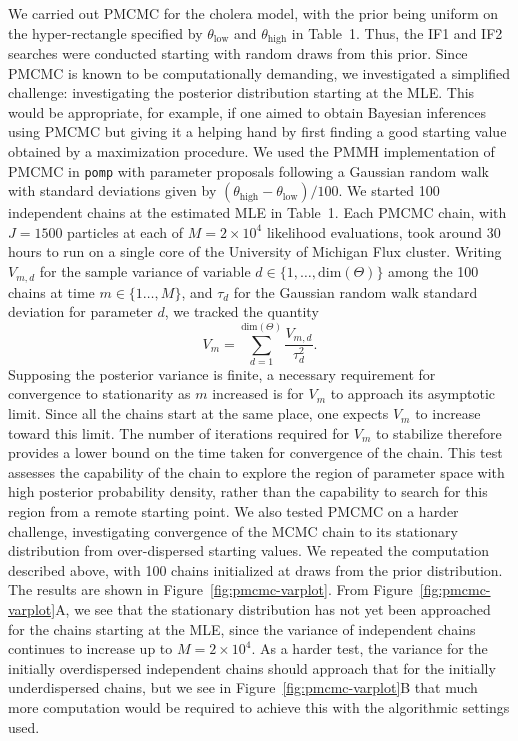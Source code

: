 \documentclass[11pt]{article}
\newcommand{\bbTheta}{\Theta}
\newcommand\Thetaspace{{\bbTheta}}
\newcommand\Thetadim{{\mathrm{dim}}(\Thetaspace)}
\begin{document}
We carried out PMCMC for the cholera model, with the prior being uniform on the hyper-rectangle specified by $\theta_\mathrm{low}$ and $\theta_\mathrm{high}$ in Table~1.
Thus, the IF1 and IF2 searches were conducted starting with random draws from this prior.
Since PMCMC is known to be computationally demanding, we investigated a simplified challenge: investigating the posterior distribution starting at the MLE.
This would be appropriate, for example, if one aimed to obtain Bayesian inferences using PMCMC but giving it a helping hand by first finding a good starting value obtained by a maximization procedure.
We used the PMMH implementation of PMCMC in \texttt{pomp} \cite{pomp} with parameter proposals following a Gaussian random walk with standard deviations given by $(\theta_\mathrm{high}-\theta_\mathrm{low})/100$.
We started 100 independent chains at the estimated MLE in Table~1.
Each PMCMC chain, with $J=1500$ particles at each of $M=2\times10^4$ likelihood evaluations, took around 30 hours to run on a single core of the University of Michigan Flux cluster.
Writing $V_{m,d}$ for the sample variance of variable $d\in\{1,\dots,\Thetadim\}$ among the 100 chains at time $m\in\{1\dots,M\}$, and $\tau_d$ for the Gaussian random walk standard deviation for parameter $d$, we tracked the quantity
\begin{equation}\label{eq:pmcmc-Vm}
V_m=\sum_{d=1}^{\Thetadim} \frac{V_{m,d}}{\tau_d^{2}}.
\end{equation}
Supposing the posterior variance is finite, a necessary requirement for convergence to stationarity as $m$ increased is for $V_m$ to approach its asymptotic limit.
Since all the chains start at the same place, one expects $V_m$ to increase toward this limit. 
The number of iterations required for $V_m$ to stabilize therefore provides a lower bound on the time taken for convergence of the chain.
This test assesses the capability of the chain to explore the region of parameter space with high posterior probability density, rather than the capability to search for this region from a remote starting point.
We also tested PMCMC on a harder challenge, investigating convergence of the MCMC chain to its stationary distribution from over-dispersed starting values.
We repeated the computation described above, with 100 chains initialized at draws from the prior distribution.
The results are shown in Figure~\ref{fig:pmcmc-varplot}.
From Figure~\ref{fig:pmcmc-varplot}A, we see that the stationary distribution has not yet been approached for the chains starting at the MLE, since the variance of independent chains continues to increase up to $M=2\times 10^4$.
As a harder test, the variance for the initially overdispersed independent chains should approach that for the initially underdispersed chains, but we see in  Figure~\ref{fig:pmcmc-varplot}B that much more computation would be required to achieve this with the algorithmic settings used.
\end{document}
